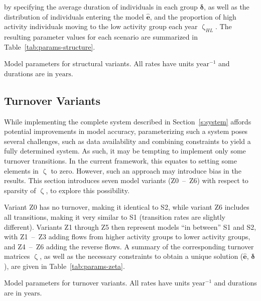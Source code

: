 \documentclass[10pt]{article}
\numberwithin{equation}{section}
\renewcommand{\zeta}{\upzeta}
\begin{document}
by specifying the average duration of individuals in each group $\bm{\delta}$,
as well as the distribution of individuals entering the model $\bm{\hat{e}}$,
and the proportion of high activity individuals moving to the low activity group each year $\zeta_{HL}$.
The resulting parameter values for each scenario
are summarized in Table~\ref{tab:params-structure}.
\begin{table}
  \centering\caption{Model parameters for structural variants.
    All rates have units $\mathrm{year}^{-1}$ and durations are in $\mathrm{years}$.}
  \label{tab:params-structure}
  
\end{table}
\subsection{Turnover Variants}\label{ss:zeta-variants}
While implementing the complete system described in Section~\ref{s:system}
affords potential improvements in model accuracy,
parameterizing such a system poses several challenges,
such as data availability
and combining constraints to yield a fully determined system.
As such, it may be tempting to implement only some turnover transitions.
In the current framework, this equates to setting some elements in $\zeta$ to zero.
However, such an approach may introduce bias in the results.
This section introduces seven model variants (Z0~--~Z6) with respect to sparsity of $\zeta$,
to explore this possibility.
\par
Variant Z0 has no turnover, making it identical to S2,
while variant Z6 includes all transitions, making it very similar to S1
(transition rates are slightly different).
Variants Z1 through Z5 then represent models ``in between'' S1 and S2,
with Z1~--~Z3 adding flows from higher activity groups to lower activity groups,
and Z4~--~Z6 adding the reverse flows.
A summary of the corresponding turnover matrices $\zeta$,
as well as the necessary constraints to obtain a unique solution ($\bm{\hat{e}}$, $\bm{\delta}$),
are given in Table~\ref{tab:params-zeta}.
\begin{table} %
  \centering\caption{Model parameters for turnover variants.
    All rates have units $\mathrm{year}^{-1}$ and durations are in $\mathrm{years}$.}
  \label{tab:params-zeta}
  
\end{table}
\end{document}
